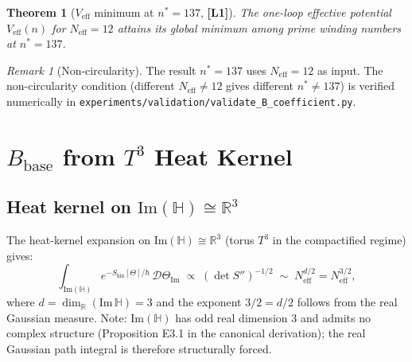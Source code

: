 \documentclass[11pt,a4paper]{article}
\newtheorem{theorem}{Theorem}
\theoremstyle{definition}
\theoremstyle{remark}
\newtheorem{remark}{Remark}
\newcommand{\Lone}{\textbf{[L1]}}
\begin{document}

\begin{theorem}[$V_{\mathrm{eff}}$ minimum at $n^* = 137$, {\Lone}]
  \label{thm:veff_min}
  The one-loop effective potential $V_{\mathrm{eff}}(n)$ for
  $N_{\mathrm{eff}} = 12$ attains its global minimum among prime
  winding numbers at $n^* = 137$.
\end{theorem}


\begin{remark}[Non-circularity]
  The result $n^* = 137$ uses $N_{\mathrm{eff}} = 12$ as input.
  The non-circularity condition (different $N_{\mathrm{eff}} \neq 12$
  gives different $n^* \neq 137$) is verified numerically in
  \texttt{experiments/validation/validate\_B\_coefficient.py}.
\end{remark}


\section{$B_{\mathrm{base}}$ from $T^3$ Heat Kernel}
\label{sec:bbase}


\subsection{Heat kernel on $\mathrm{Im}(\mathbb{H}) \cong \mathbb{R}^3$}

The heat-kernel expansion on $\mathrm{Im}(\mathbb{H}) \cong \mathbb{R}^3$
(torus $T^3$ in the compactified regime) gives:
\begin{equation}
  \int_{\mathrm{Im}(\mathbb{H})} e^{-S_{\mathrm{kin}}[\Theta]/\hbar}\,
  \mathcal{D}\Theta_{\mathrm{Im}}
  \;\propto\; (\det S'')^{-1/2}
  \;\sim\; N_{\mathrm{eff}}^{d/2} = N_{\mathrm{eff}}^{3/2},
\end{equation}
where $d = \dim_\mathbb{R}(\mathrm{Im}\,\mathbb{H}) = 3$ and the exponent
$3/2 = d/2$ follows from the real Gaussian measure.
Note: $\mathrm{Im}(\mathbb{H})$ has odd real dimension 3 and admits no
complex structure (Proposition E3.1 in the canonical derivation); the real
Gaussian path integral is therefore structurally forced.
\end{document}
